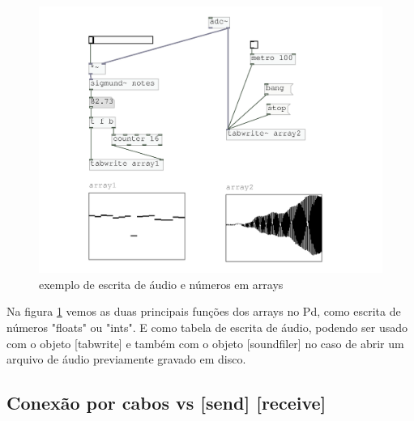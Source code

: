 \documentclass{ppgmus}
\begin{document}
\begin{figure}[!htt]
\includegraphics[scale=.6]{escrita-array}
\caption{exemplo de escrita de áudio e números em arrays}
\label{escritaarray}
\end{figure}

Na figura \ref{escritaarray} vemos as duas principais funções dos arrays
no Pd, como escrita de números "floats" ou "ints". E como tabela de escrita
de áudio, podendo ser usado com o objeto [tabwrite\texttildelow] e também
com o objeto [soundfiler] no caso de abrir um arquivo de áudio previamente
gravado em disco.


\subsection{Conexão por cabos vs [send] [receive]}
\end{document}
